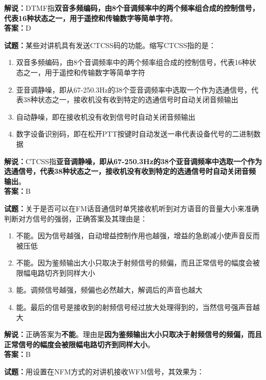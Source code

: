 \documentclass{ctexbook}
\begin{document}
\noindent\textbf{解说：}DTMF指\textbf{双音多频编码，由8个音调频率中的两个频率组合成的控制信号，代表16种状态之一，用于遥控和传输数字等简单字符}。\\\noindent\textbf{答案：}D


\bigskip


\noindent\textbf{试题：}某些对讲机具有发送CTCSS码的功能。缩写CTCSS指的是：

\begin{enumerate}[leftmargin=3em]
	\item 双音多频编码，由8个音调频率中的两个频率组合成的控制信号，代表16种状态之一，用于遥控和传输数字等简单字符
	\item 亚音调静噪，即从67-250.3Hz的38个亚音调频率中选取一个作为选通信号，代表38种状态之一，接收机没有收到特定的选通信号时自动关闭音频输出
	\item 自动静噪，即在接收机没有收到信号时自动关闭音频输出
	\item 数字设备识别码，即在松开PTT按键时自动发送一串代表设备代号的二进制数据
\end{enumerate}

\noindent\textbf{解说：}CTCSS指\textbf{亚音调静噪，即从67-250.3Hz的38个亚音调频率中选取一个作为选通信号，代表38种状态之一，接收机没有收到特定的选通信号时自动关闭音频输出}。\\\noindent\textbf{答案：}B


\bigskip


\noindent\textbf{试题：}关于是否可以在FM话音通信时单凭接收机听到对方语音的音量大小来准确判断对方信号的强弱，正确答案及其理由是：

\begin{enumerate}[leftmargin=3em]
	\item 不能。因为信号越强，自动增益控制作用也越强，增益的急剧减小使声音反而被压低
	\item 不能。因为鉴频输出大小只取决于射频信号的频偏，而且正常信号的幅度会被限幅电路切齐到同样大小
	\item 能。调频信号越强，频偏也必然越大，解调后的声音也越大
	\item 能。最后的信号是接收到的射频信号经过放大处理得到的，当然信号强声音越大
\end{enumerate}

\noindent\textbf{解说：}正确答案为\textbf{不能}。理由是\textbf{因为鉴频输出大小只取决于射频信号的频偏，而且正常信号的幅度会被限幅电路切齐到同样大小}。\\\noindent\textbf{答案：}B


\bigskip


\noindent\textbf{试题：}用设置在NFM方式的对讲机接收WFM信号，其效果为：
\end{document}
